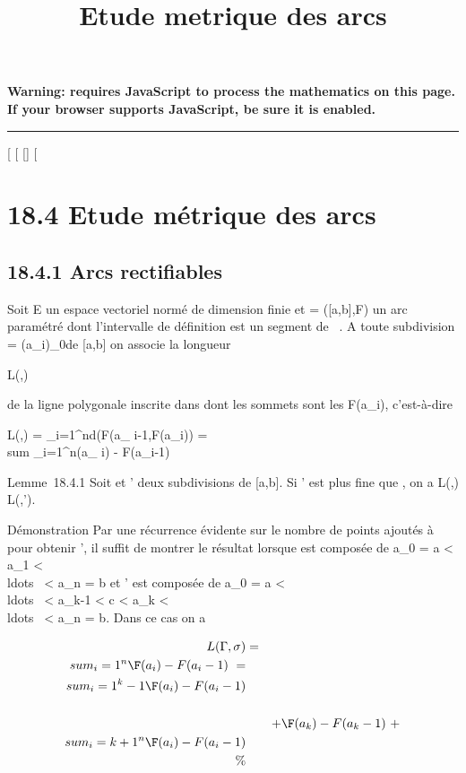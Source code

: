 \documentclass[]{article}
\title{Etude metrique des arcs}
\author{}
\date{}
\begin{document}
\maketitle

\textbf{Warning: 
requires JavaScript to process the mathematics on this page.\\ If your
browser supports JavaScript, be sure it is enabled.}

\begin{center}\rule{3in}{0.4pt}\end{center}

[
[
[]
[

\section{18.4 Etude métrique des arcs}

\subsection{18.4.1 Arcs rectifiables}

Soit E un espace vectoriel normé de dimension finie et \Gamma = ([a,b],F)
un arc paramétré dont l'intervalle de définition est un segment de ~. A
toute subdivision \sigma = (a_i)_0\leqi\leqn de [a,b] on
associe la longueur

L(\Gamma,\sigma)

de la ligne polygonale inscrite dans \Gamma dont les sommets sont les
F(a_i), c'est-à-dire

L(\Gamma,\sigma) = \sum _i=1^nd(F(a_
i-1,F(a_i)) = \\sum
_i=1^n\F(a_ i) -
F(a_i-1)\

Lemme~18.4.1 Soit \sigma et \sigma' deux subdivisions de [a,b]. Si \sigma' est plus
fine que \sigma, on a L(\Gamma,\sigma) \leq L(\Gamma,\sigma').

Démonstration Par une récurrence évidente sur le nombre de points
ajoutés à \sigma pour obtenir \sigma', il suffit de montrer le résultat lorsque \sigma
est composée de a_0 = a < a_1 <
\\ldots~ <
a_n = b et \sigma' est composée de a_0 = a <
\\ldots~ <
a_k-1 < c < a_k <
\\ldots~ <
a_n = b. Dans ce cas on a

\begin{align*} L(\Gamma,\sigma)& =&
\\sum
_i=1^n\F(a_ i) -
F(a_i-1)\ =
\\sum
_i=1^k-1\F(a_ i) -
F(a_i-1)\\%
\\ & &
+\F(a_k) -
F(a_k-1)\ +
\\sum
_i=k+1^n\F(a_ i) -
F(a_i-1)\\ \%&
\\ \end{align*}
\end{document}
